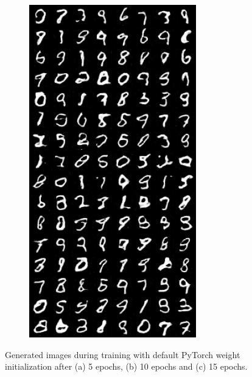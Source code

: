 \begin{figure}[H]
\begin{subfigure}{0.2\textwidth}
    \end{subfigure}%
    \begin{subfigure}{0.2\textwidth}
        \centering
        \includegraphics[width=0.95\linewidth]{init/fake_sample_epoch_0015.png}
        \caption{}
        \label{subfig:init/fake_sample_epoch_0015}
    \end{subfigure}%

    \caption{Generated images during training with default PyTorch weight initialization after (a) 5 epochs, (b) 10 epochs and (c) 15 epochs.}
    \label{fig:init}
\end{figure}

